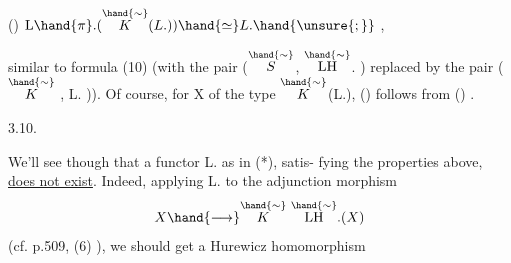 () \qquad $\mathrm{L}\hand{\pi}.(\overset{\hand{\sim}}{K}(L.)) \hand{\simeq} L.\hand{\unsure{;}}$ \quad {} ,

similar to formula (10)  (with the pair  ($\overset{\hand{\sim}}{S}$, $\overset{\hand{\sim}}{\mathrm{LH}}$. )  replaced by the pair
($\overset{\hand{\sim}}{K}$ , L\hand{$\pi$}. )).  Of course,  for X of the type $\overset{\hand{\sim}}{K}$(L.),  () follows from
() .

3.10.

 We'll see though that a functor  L\hand{$\pi$}.  \xout{(*)} as in (*),  satis-%
fying the properties above,  \uline{does not exist}.  Indeed,  applying L\hand{$\pi$}. to
the adjunction morphism
\[ X \hand{\longrightarrow} \overset{\hand{\sim}}{K}\ \overset{\hand{\sim}}{\mathrm{LH}}.(X) \]
(cf. p.509, (6) ), we should get a Hurewicz  homomorphism


